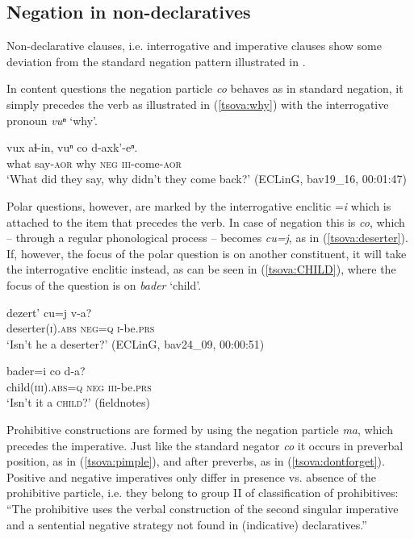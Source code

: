 \documentclass[output=paper,%
colorlinks,citecolor=brown,
showindex
]{langscibook}
\begin{document}
\subsection{Negation in non-declaratives}
\label{tsova:nondec}

Non-declarative clauses, i.e. interrogative and imperative clauses show some deviation from the standard negation pattern illustrated in . 

In content questions the negation particle \textit{co} behaves as in standard negation, it simply precedes the verb as illustrated in (\ref{tsova:why}) with the interrogative pronoun \textit{vuⁿ} `why'. 

\ea	\label{tsova:why}
\gll 	vux	aɬ-in,	vuⁿ	co	d-axk’-eⁿ.\\  
	what say-\textsc{aor} why \textsc{neg} \textsc{iii}-come-\textsc{aor}\\
\glt `What did they say, why didn’t they come back?' (ECLinG, bav19\_16, 00:01:47)
\z

Polar questions, however, are marked by the interrogative enclitic =\textit{i} which is attached to the item that precedes the verb. In case of negation this is \textit{co}, which –  through a regular phonological process –  becomes \textit{cu=j}, as in (\ref{tsova:deserter}). If, however, the focus of the polar question is on another constituent, it will take the interrogative enclitic instead, as can be seen in (\ref{tsova:CHILD}), where the focus of the question is on \textit{bader} `child'.

\ea	\label{tsova:deserter}
\gll 	dezert’	cu=j	v-a?\\  
	deserter\textsc{(i).abs} \textsc{neg=q} \textsc{i}-be.\textsc{prs}\\
\glt `Isn't he a deserter?' (ECLinG, bav24\_09, 00:00:51)
\z

\ea	\label{tsova:CHILD}
\gll 	bader=i co d-a?\\  
	child\textsc{(iii).abs}=\textsc{q} \textsc{neg} \textsc{iii}-be.\textsc{prs}\\
\glt `Isn't it a \textsc{child}?' (fieldnotes)
\z

Prohibitive constructions are formed by using the negation particle \textit{ma}, which precedes the imperative. Just like the standard negator \textit{co} it occurs in preverbal position, as in (\ref{tsova:pimple}), and after preverbs, as in (\ref{tsova:dontforget}). Positive and negative imperatives only differ in presence vs. absence of the prohibitive particle, i.e. they belong to group II of  classification of prohibitives: “The prohibitive uses the verbal construction of the second singular imperative and a sentential negative strategy
not found in (indicative) declaratives.”
\end{document}
